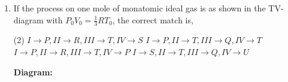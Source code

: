 
\begin{enumerate}
    \item If the process on one mole of monatomic ideal gas is as shown in the TV-diagram with \( P_0 V_0 = \frac{1}{3} RT_0 \), the correct match is,
        \begin{tasks}(2)
            \task \(I \rightarrow P, II \rightarrow R, III \rightarrow T, IV \rightarrow S\)
            \task \(I \rightarrow P, II \rightarrow T, III \rightarrow Q, IV \rightarrow T\)
            \task \(I \rightarrow P, II \rightarrow R, III \rightarrow T, IV \rightarrow P\)
            \task \(I \rightarrow S, II \rightarrow T, III \rightarrow Q, IV \rightarrow U\)
        \end{tasks}
    \item[\textbf{Diagram:}]
        \begin{center}
        \end{center}
\end{enumerate}
